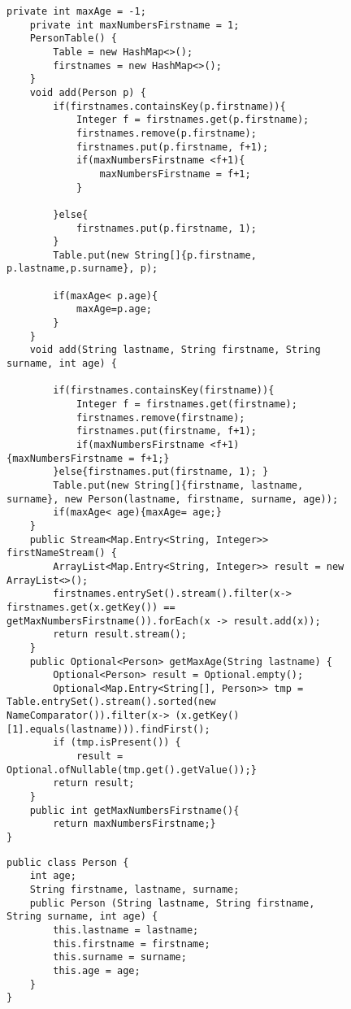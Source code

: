 \documentclass[a4paper, 14pt]{extarticle}
\begin{document}
\begin{figure}[!htb]
\begin{lstlisting}[language={},caption={класс PersonTable(продолжение)},label={lst:code3}]
    private int maxAge = -1;
    private int maxNumbersFirstname = 1;
    PersonTable() {
        Table = new HashMap<>();
        firstnames = new HashMap<>();
    }
    void add(Person p) {
        if(firstnames.containsKey(p.firstname)){
            Integer f = firstnames.get(p.firstname);
            firstnames.remove(p.firstname);
            firstnames.put(p.firstname, f+1);
            if(maxNumbersFirstname <f+1){
                maxNumbersFirstname = f+1;
            }

        }else{
            firstnames.put(p.firstname, 1);
        }
        Table.put(new String[]{p.firstname, p.lastname,p.surname}, p);

        if(maxAge< p.age){
            maxAge=p.age;
        }
    }
    void add(String lastname, String firstname, String surname, int age) {

        if(firstnames.containsKey(firstname)){
            Integer f = firstnames.get(firstname);
            firstnames.remove(firstname);
            firstnames.put(firstname, f+1);
            if(maxNumbersFirstname <f+1){maxNumbersFirstname = f+1;}
        }else{firstnames.put(firstname, 1); }
        Table.put(new String[]{firstname, lastname, surname}, new Person(lastname, firstname, surname, age));
        if(maxAge< age){maxAge= age;}
    }
    public Stream<Map.Entry<String, Integer>> firstNameStream() {
        ArrayList<Map.Entry<String, Integer>> result = new ArrayList<>();
        firstnames.entrySet().stream().filter(x-> firstnames.get(x.getKey()) == getMaxNumbersFirstname()).forEach(x -> result.add(x));
        return result.stream();
    }
    public Optional<Person> getMaxAge(String lastname) {
        Optional<Person> result = Optional.empty();
        Optional<Map.Entry<String[], Person>> tmp = Table.entrySet().stream().sorted(new NameComparator()).filter(x-> (x.getKey()[1].equals(lastname))).findFirst();
        if (tmp.isPresent()) {
            result = Optional.ofNullable(tmp.get().getValue());}
        return result;
    }
    public int getMaxNumbersFirstname(){
        return maxNumbersFirstname;}
}
\end{lstlisting}
\end{figure}

\begin{figure}[!htb]
\begin{lstlisting}[language={},caption={класс Person},label={lst:code4}]
public class Person {
    int age;
    String firstname, lastname, surname;
    public Person (String lastname, String firstname, String surname, int age) {
        this.lastname = lastname;
        this.firstname = firstname;
        this.surname = surname;
        this.age = age;
    }
}
\end{lstlisting}
\end{figure}
\end{document}
